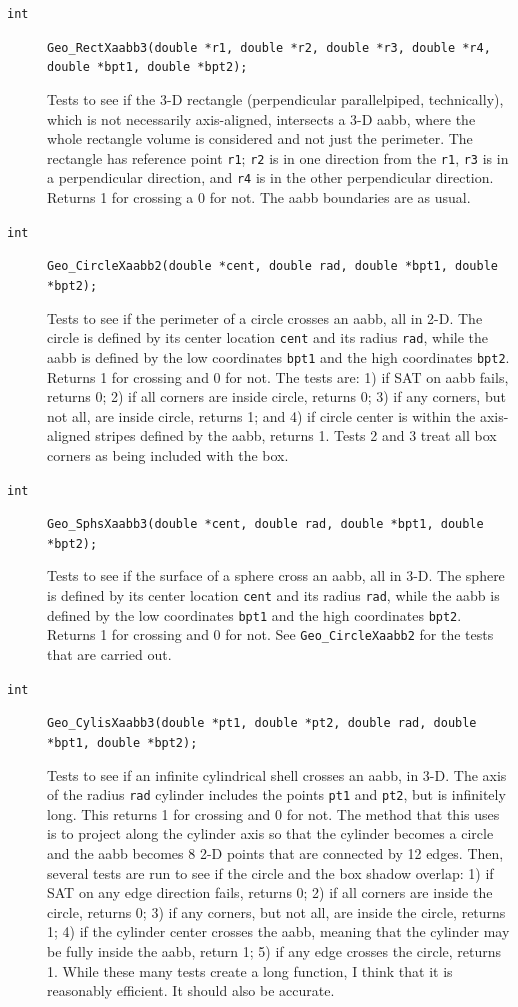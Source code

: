 \documentclass[11pt]{article}
\newcommand {\ttt} {\texttt}
\begin{document}
\begin{description}
\item[\ttt{int}]
\ttt{Geo\_RectXaabb3(double *r1, double *r2, double *r3, double *r4, double *bpt1, double *bpt2);}

Tests to see if the 3-D rectangle (perpendicular parallelpiped, technically), which is not necessarily axis-aligned, intersects a 3-D aabb, where the whole rectangle volume is considered and not just the perimeter. The rectangle has reference point \ttt{r1}; \ttt{r2} is in one direction from the \ttt{r1}, \ttt{r3} is in a perpendicular direction, and \ttt{r4} is in the other perpendicular direction. Returns 1 for crossing a 0 for not. The aabb boundaries are as usual.

\item[\ttt{int}]
\ttt{Geo\_CircleXaabb2(double *cent, double rad, double *bpt1, double *bpt2);}

Tests to see if the perimeter of a circle crosses an aabb, all in 2-D. The circle is defined by its center location \ttt{cent} and its radius \ttt{rad}, while the aabb is defined by the low coordinates \ttt{bpt1} and the high coordinates \ttt{bpt2}. Returns 1 for crossing and 0 for not. The tests are: 1) if SAT on aabb fails, returns 0; 2) if all corners are inside circle, returns 0; 3) if any corners, but not all, are inside circle, returns 1; and 4) if circle center is within the axis-aligned stripes defined by the aabb, returns 1. Tests 2 and 3 treat all box corners as being included with the box.

\item[\ttt{int}]
\ttt{Geo\_SphsXaabb3(double *cent, double rad, double *bpt1, double *bpt2);}

Tests to see if the surface of a sphere cross an aabb, all in 3-D. The sphere is defined by its center location \ttt{cent} and its radius \ttt{rad}, while the aabb is defined by the low coordinates \ttt{bpt1} and the high coordinates \ttt{bpt2}. Returns 1 for crossing and 0 for not. See \ttt{Geo\_CircleXaabb2} for the tests that are carried out.

\item[\ttt{int}]
\ttt{Geo\_CylisXaabb3(double *pt1, double *pt2, double rad, double *bpt1, double *bpt2);}

Tests to see if an infinite cylindrical shell crosses an aabb, in 3-D. The axis of the radius \ttt{rad} cylinder includes the points \ttt{pt1} and \ttt{pt2}, but is infinitely long. This returns 1 for crossing and 0 for not. The method that this uses is to project along the cylinder axis so that the cylinder becomes a circle and the aabb becomes 8 2-D points that are connected by 12 edges. Then, several tests are run to see if the circle and the box shadow overlap: 1) if SAT on any edge direction fails, returns 0; 2) if all corners are inside the circle, returns 0; 3) if any corners, but not all, are inside the circle, returns 1; 4) if the cylinder center crosses the aabb, meaning that the cylinder may be fully inside the aabb, return 1; 5) if any edge crosses the circle, returns 1. While these many tests create a long function, I think that it is reasonably efficient. It should also be accurate.


\end{description}
\end{document}
